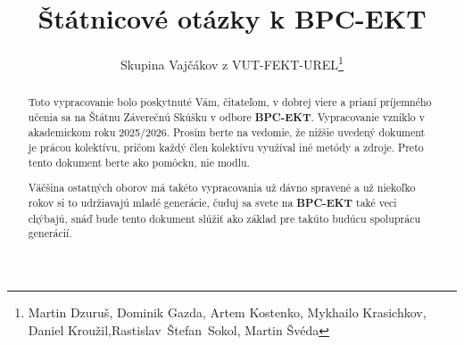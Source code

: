 \documentclass[%
12pt,       				%
a4paper,    				%
oneside,      			%
unicode,						%
]{report}				    	%
\title{Štátnicové otázky k BPC-EKT}
\author{Skupina Vajčákov z VUT-FEKT-UREL\thanks{Martin Dzuruš, Dominik Gazda, Artem Kostenko, Mykhailo Krasichkov, Daniel Kroužil,\newline Rastislav~Štefan~Sokol, Martin Švéda}}
\begin{document}
	
	\maketitle
	\begin{abstract}
		Toto vypracovanie bolo poskytnuté Vám, čitateľom, v dobrej viere a prianí príjemného učenia sa na Štátnu Záverečnú Skúšku v odbore \textbf{BPC-EKT}. Vypracovanie vzniklo v akademickom roku 2025/2026. Prosím berte na vedomie, že nižšie uvedený dokument je prácou kolektívu, pričom každý člen kolektívu využíval iné metódy a zdroje. Preto tento dokument berte ako pomôcku, nie modlu.
		
		Väčšina ostatných oborov má takéto vypracovania už dávno spravené a už niekoľko rokov si to udržiavajú mladé generácie, čuduj sa svete na \textbf{BPC-EKT} také veci chýbajú, snáď bude tento dokument slúžiť ako základ pre takúto budúcu spoluprácu generácií.
	\end{abstract}
	\tableofcontents
	\renewcommand{\chaptername}{Okruh}
	
	
	
	
	
	
	
	
	
	
	
	
	
	
	
%	
\end{document}
